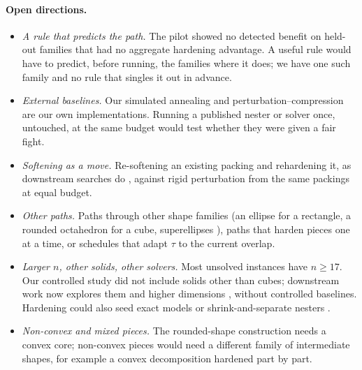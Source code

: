\paragraph{Open directions.}
\begin{itemize}\itemsep1pt
\item \emph{A rule that predicts the path.} The pilot showed no detected benefit on held-out families that had no aggregate hardening advantage. A useful rule would have to predict, before running, the families where it does; we have one such family and no rule that singles it out in advance.
\item \emph{External baselines.} Our simulated annealing and perturbation--compression are our own implementations. Running a published nester \cite{Gardeyn2025} or solver \cite{Berthold2026} once, untouched, at the same budget would test whether they were given a fair fight.
\item \emph{Softening as a move.} Re-softening an existing packing and rehardening it, as downstream searches do \cite{n13repo,platonicrepo}, against rigid perturbation from the same packings at equal budget.
\item \emph{Other paths.} Paths through other shape families (an ellipse for a rectangle, a rounded octahedron for a cube, superellipses \cite{Jiao2008}), paths that harden pieces one at a time, or schedules that adapt $\tau$ to the current overlap.
\item \emph{Larger $n$, other solids, other solvers.} Most unsolved instances have $n\ge17$. Our controlled study did not include solids other than cubes; downstream work now explores them \cite{platonicrepo} and higher dimensions \cite{tesseractrepo}, without controlled baselines. Hardening could also seed exact models \cite{Berthold2026} or shrink-and-separate nesters \cite{Gardeyn2025}.
\item \emph{Non-convex and mixed pieces.} The rounded-shape construction needs a convex core; non-convex pieces would need a different family of intermediate shapes, for example a convex decomposition hardened part by part.
\end{itemize}
